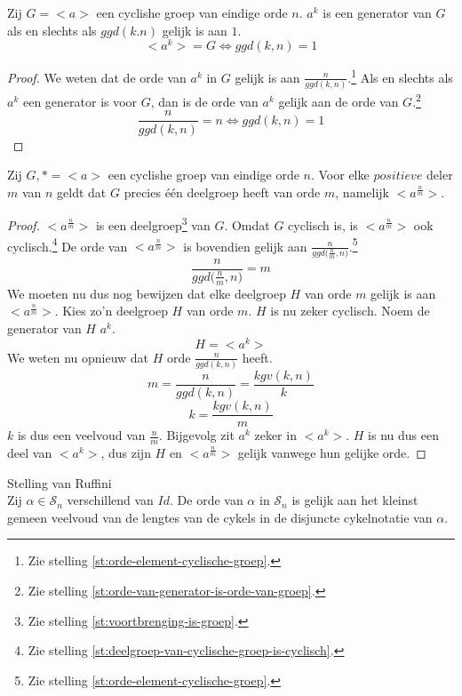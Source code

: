 \documentclass[main.tex]{subfiles}
\begin{document}
\begin{st}
  Zij $G = <a>$ een cyclishe groep van eindige orde $n$.
  $a^{k}$ is een generator van $G$ als en slechts als $ggd(k.n)$ gelijk is aan $1$.
  \[ <a^{k}> = G \Leftrightarrow ggd(k,n) = 1 \]

  \begin{proof}
     We weten dat de orde van $a^{k}$ in $G$ gelijk is aan $\frac{n}{ggd(k,n)}$.\footnote{Zie stelling \ref{st:orde-element-cyclische-groep}.}
     Als en slechts als $a^{k}$ een generator is voor $G$, dan is de orde van $a^{k}$ gelijk aan de orde van $G$.\footnote{Zie stelling \ref{st:orde-van-generator-is-orde-van-groep}.}
     \[ \frac{n}{ggd(k,n)} = n \Leftrightarrow ggd(k,n) = 1 \]
  \end{proof}
\end{st}

\begin{st}
  Zij $G,* = <a>$ een cyclishe groep van eindige orde $n$.
  Voor elke $positieve$ deler $m$ van $n$ geldt dat $G$ precies \'e\'en deelgroep heeft van orde $m$, namelijk $<a^{\frac{n}{m}}>$.
  \begin{proof}
    $<a^{\frac{n}{m}}>$ is een deelgroep\footnote{Zie stelling \ref{st:voortbrenging-is-groep}.} van $G$.
    Omdat $G$ cyclisch is, is $<a^{\frac{n}{m}}>$ ook cyclisch.\footnote{Zie stelling \ref{st:deelgroep-van-cyclische-groep-is-cyclisch}.} De orde van $<a^{\frac{n}{m}}>$ is bovendien gelijk aan $\frac{n}{ggd({\frac{n}{m},n)}}$.\footnote{Zie stelling \ref{st:orde-element-cyclische-groep}.}
    \[ \frac{n}{ggd({\frac{n}{m},n)}} = m \]
    We moeten nu dus nog bewijzen dat elke deelgroep $H$ van orde $m$ gelijk is aan $<a^{\frac{n}{m}}>$.
    Kies zo'n deelgroep $H$ van orde $m$. $H$ is nu zeker cyclisch.
    Noem de generator van $H$ $a^{k}$.
    \[ H = <a^{k}> \]
    We weten nu opnieuw dat $H$ orde $\frac{n}{ggd(k,n)}$ heeft.
    \[ m = \frac{n}{ggd(k,n)} = \frac{kgv(k,n)}{k} \]
    \[ k = \frac{kgv(k,n)}{m} \]
    $k$ is dus een veelvoud van $\frac{n}{m}$.
    Bijgevolg zit $a^{k}$ zeker in $<a^{k}>$.
    $H$ is nu dus een deel van $<a^{k}>$, dus zijn $H$ en $<a^{\frac{n}{m}}>$ gelijk vanwege hun gelijke orde.
  \end{proof}
\end{st}

\begin{st}
  \label{st:stelling-van-ruffini}
  Stelling van Ruffini\\
  Zij $\alpha\in \mathcal{S}_{n}$ verschillend van $Id$. De orde van $\alpha$ in $\mathcal{S}_{n}$ is gelijk aan het kleinst gemeen veelvoud van de lengtes van de cykels in de disjuncte cykelnotatie van $\alpha$.
\end{st}
\end{document}

